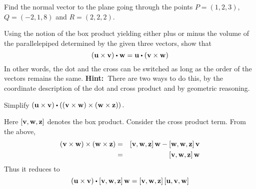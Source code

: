 \begin{enumialphparenastyle}
\begin{ex} Find the normal vector to the plane going through the points $P=(1,2,3)$, $Q=(-2,1,8)$ and $R=(2,2,2)$.
\end{ex}

\begin{ex} Using the notion of the box product yielding either plus or minus the
volume of the parallelepiped determined by the given three vectors, show
that
\begin{equation*}
\tup{\vect{u}\times \vect{v}} \dotprod \vect{w}=\vect{u}\dotprod \tup{
\vect{v}\times \vect{w}}
\end{equation*}
In other words, the dot and the cross can be switched as long as the order
of the vectors remains the same. \textbf{Hint:\ }There are two ways to do
this, by the coordinate description of the dot and cross product and by
geometric reasoning. 
\end{ex}

\begin{ex} Simplify $\tup{\vect{u}\times \vect{v}} \dotprod \tup{\tup{
\vect{v}\times \vect{w}} \times \tup{\vect{w}\times \vect{z}}} .$
\begin{sol}
Here $\left[ {\bf v},{\bf w},{\bf z}\right]$ denotes the box product. Consider the cross product term. From the above,
\begin{eqnarray*}
\left({\bf v}\times {\bf w}\right) \times \left({\bf w}\times {\bf z}\right) &=& 
\left[ {\bf v},{\bf w},{\bf z}\right] {\bf w}-\left[ {\bf w},{\bf w},{\bf z}\right] {\bf v} \\
&=&\left[ {\bf v},{\bf w},{\bf z}\right] {\bf w}
\end{eqnarray*}
Thus it reduces to
\[
\tup{\vect{u}\times \vect{v}} \dotprod \left[ \vect{v},\vect{w},\vect{z}\right] \vect{w}=\left[ \vect{v},\vect{w},\vect{z}\right] \left[ \vect{u},\vect{v},\vect{w}\right]
\]
\end{sol}
\end{ex}


\end{enumialphparenastyle}
